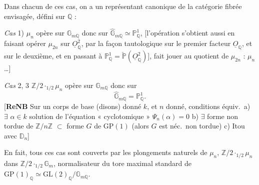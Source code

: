 \documentclass[11pt,a4paper]{article}
\begin{document}

Dans chacun de ces cas, on a un représentant canonique de la catégorie
fibrée envisagée, défini sur $\mathbb{Q}$ : 

\emph{Cas} 1) $\mu_n$ opère sur $\mathbb{G}_{m\mathbb{Q}}$ donc sur
$\widehat{\mathbb{G}}_{m\mathbb{Q}} \simeq \mathbb{P}^1_{\mathbb{Q}}$,
[l'opération s'obtient aussi en faisant opérer $\mu_{2n}$ sur
$\underline{O}^2_{\mathbb{Q}}$, par la façon tautologique sur le premier
facteur $\underline{O}_{\mathbb{Q}}$, et \struck{\ill{}} 
sur le deuxième, et en passant à
$\mathbb{P}^1_{\mathbb{Q}} = \check{\mathbb{P}}(\underline{O}^2_{\mathbb{Q}})$],
 fait jouer au quotient de $\mu_{2n}$ : $\mu_n$ \ldots]

\emph{Cas} 2, 3 $\mathbb{Z}/2 \cdot_{1/2} \mu_n$ opère sur
$\mathbb{G}_{m\mathbb{Q}}$ donc sur
\[
  \widehat{\mathbb{G}}_{m\mathbb{Q}} = \mathbb{P}^1_{\mathbb{Q}} .
\]
[\textbf{ReNB} Sur un corps de base (disons) donné $k$, et $n$ donné,
conditions équiv.\ a) $\exists$ $\alpha \in k$ solution de l'équation
« cyclotomique » $\Psi_n(\alpha) = 0$ b) $\exists$ forme non tordue de
$\mathbb{Z}/n\mathbb{Z}$ $\subset$ forme $G$ de $\mathrm{GP}(1)$ (alors $G$
est néc.\ non tordue) c) Itou avec $\mathbb{D}_n$]

 En fait, tous ces cas sont couverts par les plongements
naturels de $\mu_n$, $\mathbb{Z}/2 \cdot_{1/2} \mu_n$ dans
$\mathbb{Z}/2 \cdot_{1/2} \mathbb{G}_m$, normalisateur du tore maximal
standard de
$\mathrm{GP}(1)_{\mathbb{Q}} \simeq \mathrm{GL}(2)_{\mathbb{Q}}/\mathbb{G}_{m\mathbb{Q}}$.
\end{document}
